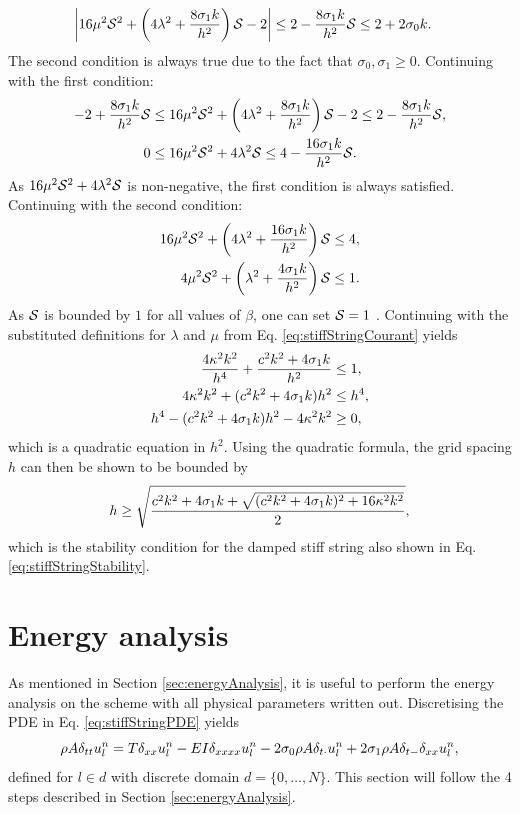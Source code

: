 {\begin{equation}
\begin{aligned}
        \left|16\mu^2\S^2+\left(4\lambda^2+\frac{8\so k}{h^2}\right)\S - 2\right|&\leq2-\frac{8\so k}{h^2}\S\leq2+2\sz k.
    \end{aligned}
\end{equation}
The second condition is always true due to the fact that $\sigma_0,\sigma_1 \geq 0$. Continuing with the first condition: 
\begin{align*}
    -2+\frac{8\so k}{h^2}\S&\leq 16\mu^2\S^2+\left(4\lambda^2+\frac{8\so k}{h^2}\right)\S - 2\leq 2-\frac{8\so k}{h^2}\S,\\
    0&\leq 16\mu^2\S^2+4\lambda^2\S\leq 4-\frac{16\so k}{h^2}\S.
\end{align*}
As $16\mu^2\S^2+4\lambda^2\S$ is non-negative, the first condition is always satisfied. Continuing with the second condition:
\begin{align*}
    16\mu^2\S^2+\left(4\lambda^2+ \frac{16\so k}{h^2}\right)\S &\leq 4,\\
    4\mu^2\S^2+\left(\lambda^2+ \frac{4\so k}{h^2}\right)\S&\leq 1.
\end{align*}
As $\S$ is bounded by $1$ for all values of $\beta$, one can set $\S = 1$ . Continuing with the substituted definitions for $\lambda$ and $\mu$ from Eq. \eqref{eq:stiffStringCourant} yields
\begin{align*}
    \frac{4\kappa^2k^2}{h^4}+\frac{c^2k^2 + 4\so k}{h^2}&\leq 1, \\
    4\kappa^2k^2+(c^2k^2+ 4\so k)h^2&\leq h^4,\\
    h^4- (c^2k^2+ 4\so k)h^2 - 4\kappa^2k^2 &\geq 0 ,
\end{align*}
which is a quadratic equation in $h^2$. Using the quadratic formula, the grid spacing $h$ can then be shown to be bounded by
\begin{equation}
    h \geq \sqrt{\frac{c^2k^2+4\so k + \sqrt{(c^2k^2 + 4\so k)^2+16\kappa^2k^2}}{2}},
\end{equation}
which is the stability condition for the damped stiff string also shown in Eq. \eqref{eq:stiffStringStability}.

\section{Energy analysis}\label{sec:energyAnalysisString}
As mentioned in Section \ref{sec:energyAnalysis}, it is useful to perform the energy analysis on the scheme with all physical parameters written out. Discretising the PDE in Eq. \eqref{eq:stiffStringPDE} yields
\begin{equation}
    \rho A \dtt \uln = T \dxx \uln - EI \dxxxx \uln - 2\sz \rho A \dtd \uln + 2 \so \rho A \dtm \dxx \uln,
\end{equation}
defined for $l\in d$ with discrete domain $d = \{0, \hdots, N\}$. This section will follow the 4 steps described in Section \ref{sec:energyAnalysis}.

}
